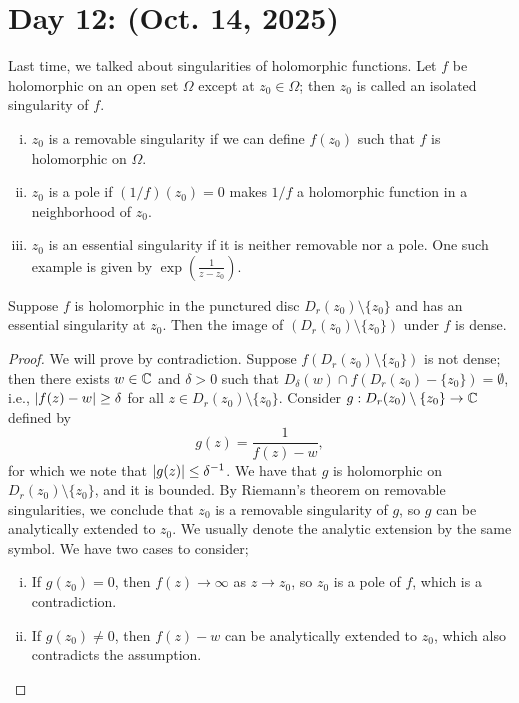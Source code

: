 \section{Day 12: (Oct. 14, 2025)}
Last time, we talked about singularities of holomorphic functions. Let $f$ be holomorphic on an open set $\Omega$ except at $z_0 \in \Omega$; then $z_0$ is called an isolated singularity of $f$.
\begin{enumerate}[(i)]
    \item $z_0$ is a removable singularity if we can define $f(z_0)$ such that $f$ is holomorphic on $\Omega$.
    \item $z_0$ is a pole if $(1/f)(z_0) = 0$ makes $1/f$ a holomorphic function in a neighborhood of $z_0$.
    \item $z_0$ is an essential singularity if it is neither removable nor a pole. One such example is given by $\exp(\frac{1}{z - z_0})$.
\end{enumerate}
\begin{theorem}
    Suppose $f$ is holomorphic in the punctured disc $D_r(z_0) \setminus \{z_0\}$ and has an essential singularity at $z_0$. Then the image of $(D_r(z_0) \setminus \{z_0\})$ under $f$ is dense.
\end{theorem}
\begin{proof}
    We will prove by contradiction. Suppose $f(D_r(z_0) \setminus \{z_0\})$ is not dense; then there exists $w \in \mathbb C$ and $\delta > 0$ such that $D_\delta(w) \cap f(D_r(z_0) - \{z_0\}) = \emptyset$, i.e., $\left\lvert f(z) - w \right\rvert \geq \delta$ for all $z \in D_r(z_0) \setminus \{z_0\}$. Consider $g : D_r(z_0) \setminus \{z_0\} \to \mathbb C$ defined by
    \[ g(z) = \frac{1}{f(z) - w}, \]
    for which we note that $\left\lvert g(z) \right\rvert \leq \delta^{-1}$. We have that $g$ is holomorphic on $D_r(z_0) \setminus \{z_0\}$, and it is bounded. By Riemann's theorem on removable singularities, we conclude that $z_0$ is a removable singularity of $g$, so $g$ can be analytically extended to $z_0$. We usually denote the analytic extension by the same symbol. We have two cases to consider;
    \begin{enumerate}[(i)]
        \item If $g(z_0) = 0$, then $f(z) \to \infty$ as $z \to z_0$, so $z_0$ is a pole of $f$, which is a contradiction.
        \item If $g(z_0) \neq 0$, then $f(z) - w$ can be analytically extended to $z_0$, which also contradicts the assumption. \qedhere
    \end{enumerate}
\end{proof}
